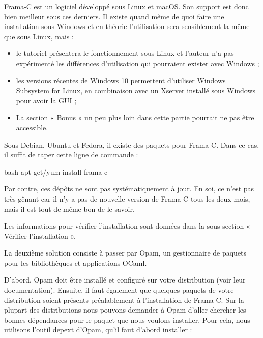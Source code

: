 

Frama-C est un logiciel développé sous Linux et macOS. Son support est donc bien
meilleur sous ces derniers. Il existe quand même de quoi faire une installation
sous Windows et en théorie l'utilisation sera sensiblement la même que sous
Linux, mais :



\begin{Warning}
\begin{itemize}
\item le tutoriel présentera le fonctionnement sous Linux et l'auteur n'a pas
expérimenté les différences d'utilisation qui pourraient exister avec
Windows ;
\item les versions récentes de Windows 10 permettent d'utiliser Windows Subsystem
  for Linux, en combinaison avec un Xserver installé sous Windows pour avoir la
  GUI ;
\item La section « Bonus » un peu plus loin dans cette partie pourrait ne pas être
accessible.
\end{itemize}
\end{Warning}






Sous Debian, Ubuntu et Fedora, il existe des paquets pour Frama-C. Dans ce cas,
il suffit de taper cette ligne de commande :



\begin{CodeBlock}{bash}
apt-get/yum install frama-c
\end{CodeBlock}



Par contre, ces dépôts ne sont pas systématiquement à jour. En soi, ce n'est pas très gênant car il n'y a pas de nouvelle version de Frama-C tous les deux mois, mais il est tout de même bon de le savoir.



Les informations pour vérifier l'installation sont données dans la sous-section « Vérifier l'installation ».




La deuxième solution consiste à passer par Opam, un gestionnaire de paquets
pour les bibliothèques et applications OCaml.


D'abord, Opam doit être installé et configuré sur votre distribution (voir
leur documentation). Ensuite, il faut également que quelques paquets de votre
distribution soient présents préalablement à l'installation de Frama-C. Sur la
plupart des distributions nous pouvons demander à Opam d'aller chercher les
bonnes dépendances pour le paquet que nous voulons installer. Pour cela, nous
utilisons l'outil depext d'Opam, qu'il faut d'abord installer :


